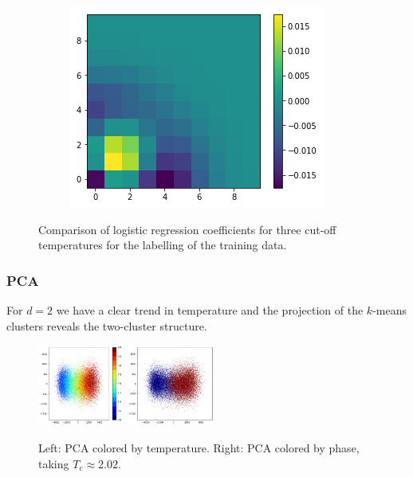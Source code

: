 \documentclass[11pt]{article}
\begin{document}
\begin{figure}[h]
\begin{subfigure}{0.3\textwidth}
		\centering
		\includegraphics[width=\textwidth]{squareice_images/logreg_2d_221}
	\end{subfigure}
	\caption{Comparison of logistic regression coefficients for three cut-off temperatures for the labelling of the training data.}
\end{figure}


\subsubsection{PCA}
For $d=2$ we have a clear trend in temperature and the projection of the $k$-means clusters reveals the two-cluster structure.
\begin{figure}[h]
    \centering
    \includegraphics[width=0.25\textwidth]{squareice_images/pca_2d_squareice}
    \includegraphics[width=0.26\textwidth]{squareice_images/pca_phase_2d_squareice}
    \caption{Left: PCA colored by temperature. Right: PCA colored by phase, taking $T_\text{c}\approx2.02$.}
    \label{fig:SquareicePCA}
\end{figure}
\end{document}
